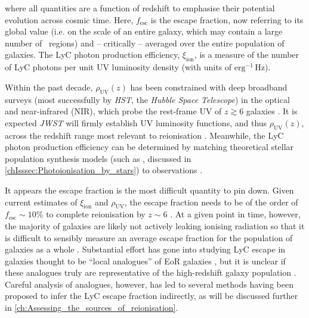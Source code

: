 \noindent where all quantities are a function of redshift to emphasise their potential evolution across cosmic time. Here, $f_\text{esc}$ is the escape fraction, now referring to its global value (i.e. on the scale of an entire galaxy, which may contain a large number of \HII\ regions) and -- critically -- averaged over the entire population of galaxies. The LyC photon production efficiency, $\xi_\text{ion}$, is a measure of the number of LyC photons per unit UV luminosity density (with units of $\mathrm{erg^{-1} \, Hz}$).

Within the past decade, $\rho_\text{UV} (z)$ has been constrained with deep broadband surveys (most successfully by \textit{HST}, the \textit{Hubble Space Telescope}) in the optical and near-infrared (NIR), which probe the rest-frame UV of $z \gtrsim 6$ galaxies \citep[typically around $\lambda_\text{emit} \sim 1500 \, \Angstrom$; e.g.][]{2021AJ....162...47B}. It is expected \textit{JWST} will firmly establish UV luminosity functions, and thus $\rho_\text{UV} (z)$, across the redshift range most relevant to reionisation \citep[e.g.][]{2022arXiv220801612H}. Meanwhile, the LyC photon production efficiency can be determined by matching theoretical stellar population synthesis models (such as , discussed in \cref{chIsssec:Photoionisation_by_stars}) to observations \citep[e.g.][]{2015MNRAS.454.1393S, 2017MNRAS.467.3306S, 2018MNRAS.479.3264C}.

It appears the escape fraction is the most difficult quantity to pin down. Given current estimates of $\xi_\text{ion}$ and $\rho_\text{UV}$, the escape fraction needs to be of the order of $f_\text{esc} \sim 10\%$ to complete reionisation by $z \sim 6$ \citep[e.g.][]{2015ApJ...802L..19R, 2018MNRAS.479..994R, 2020MNRAS.498..164K}. At a given point in time, however, the majority of galaxies are likely not actively leaking ionising radiation so that it is difficult to sensibly measure an average escape fraction for the population of galaxies as a whole \citep[e.g.][]{2022MNRAS.512.5960M}. Substantial effort has gone into studying LyC escape in galaxies thought to be ``local analogues'' of EoR galaxies \citep[e.g.][]{2016ApJ...827..126B, 2019ApJ...874...93B, 2017MNRAS.472.2608S, 2019MNRAS.488.3492S, 2021MNRAS.503.6112S, 2016MNRAS.461.3683I, 2016Natur.529..178I, 2018MNRAS.474.4514I, 2018MNRAS.478.4851I, 2021MNRAS.503.1734I, 2018ApJ...855...96H, 2019ApJ...885...57W, 2021ApJ...916....3W}, but it is unclear if these analogues truly are representative of the high-redshift galaxy population \citep[e.g.][]{2022arXiv220713693K}. Careful analysis of analogues, however, has led to several methods having been proposed to infer the LyC escape fraction indirectly, as will be discussed further in \cref{ch:Assessing_the_sources_of_reionisation}.

